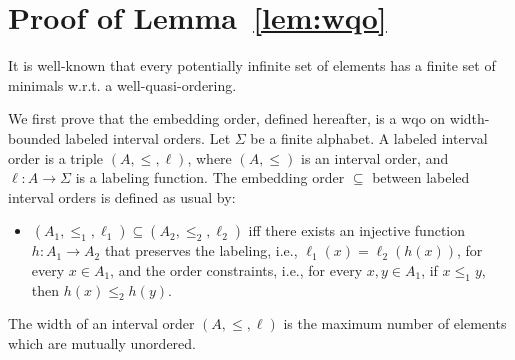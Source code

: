 \appendix
\section{Proof of Lemma~\ref{lem:wqo}}

It is well-known that every potentially infinite set of elements has a finite set of minimals w.r.t. a well-quasi-ordering.

We first prove that the embedding order, defined hereafter, is a wqo on width-bounded
labeled interval orders.
Let $\Sigma$ be a finite alphabet. A labeled interval order is a triple $(A,\leq,\ell)$, where $(A,\leq)$ is an interval
order, and $\ell:A\rightarrow \Sigma$ is a labeling function. The embedding order $\subseteq$ between labeled interval orders is defined as
usual by:
\begin{itemize}
	\item $(A_1,\leq_1,\ell_1)\subseteq (A_2,\leq_2,\ell_2)$ iff there exists an injective function $h:A_1\rightarrow A_2$ that
	preserves the labeling, i.e., $\ell_1(x)=\ell_2(h(x))$, for every $x\in A_1$, and the order constraints, i.e.,
	for every $x,y\in A_1$, if $x \leq_1 y$, then $h(x)\leq_2 h(y)$.
\end{itemize}

The width of an interval order $(A,\leq,\ell)$ is the maximum number of elements which are mutually unordered.

